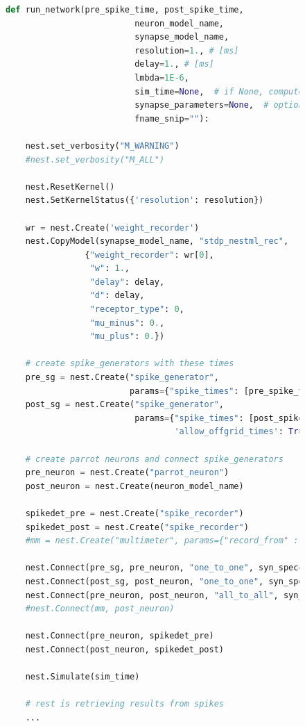 \clearpage

\begin{figure}[ht!]
\centering

\begin{lstlisting}[language=Python, label=lst:build_network_with_jit, caption={Creating the network with JIT}]
def run_network(pre_spike_time, post_spike_time,
                          neuron_model_name,
                          synapse_model_name,
                          resolution=1., # [ms]
                          delay=1., # [ms]
                          lmbda=1E-6,
                          sim_time=None,  # if None, computed from pre and post spike times
                          synapse_parameters=None,  # optional dictionary passed to the synapse
                          fname_snip=""):

    nest.set_verbosity("M_WARNING")
    #nest.set_verbosity("M_ALL")

    nest.ResetKernel()
    nest.SetKernelStatus({'resolution': resolution})

    wr = nest.Create('weight_recorder')
    nest.CopyModel(synapse_model_name, "stdp_nestml_rec",
                {"weight_recorder": wr[0],
                 "w": 1.,
                 "delay": delay,
                 "d": delay,
                 "receptor_type": 0,
                 "mu_minus": 0.,
                 "mu_plus": 0.})

    # create spike_generators with these times
    pre_sg = nest.Create("spike_generator",
                         params={"spike_times": [pre_spike_time, sim_time - 10.]})
    post_sg = nest.Create("spike_generator",
                          params={"spike_times": [post_spike_time],
                                  'allow_offgrid_times': True})

    # create parrot neurons and connect spike_generators
    pre_neuron = nest.Create("parrot_neuron")
    post_neuron = nest.Create(neuron_model_name)

    spikedet_pre = nest.Create("spike_recorder")
    spikedet_post = nest.Create("spike_recorder")
    #mm = nest.Create("multimeter", params={"record_from" : ["V_m"]})

    nest.Connect(pre_sg, pre_neuron, "one_to_one", syn_spec={"delay": 1.})
    nest.Connect(post_sg, post_neuron, "one_to_one", syn_spec={"delay": 1., "weight": 9999.})
    nest.Connect(pre_neuron, post_neuron, "all_to_all", syn_spec={'synapse_model': 'stdp_nestml_rec', "post_ports": ["post_spikes"]})
    #nest.Connect(mm, post_neuron)

    nest.Connect(pre_neuron, spikedet_pre)
    nest.Connect(post_neuron, spikedet_post)
    
    nest.Simulate(sim_time)
    
    # rest is retrieving results from spikes
    ...

\end{lstlisting}
\end{figure}

\cleardoublepage
